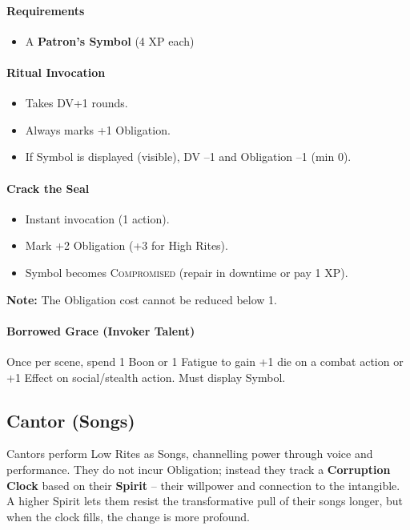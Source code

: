 \paragraph{Requirements}
\begin{itemize}
  \item A \textbf{Patron's Symbol} (4 XP each)
\end{itemize}

\paragraph{Ritual Invocation}
\begin{itemize}
  \item Takes DV+1 rounds.
  \item Always marks +1 Obligation.
  \item If Symbol is displayed (visible), DV --1 and Obligation --1 (min 0).
\end{itemize}

\paragraph{Crack the Seal}
\begin{itemize}
  \item Instant invocation (1 action).
  \item Mark +2 Obligation (+3 for High Rites).
  \item Symbol becomes \textsc{Compromised} (repair in downtime or pay 1 XP).
\end{itemize}

\textbf{Note:} The Obligation cost cannot be reduced below 1.

\paragraph{Borrowed Grace (Invoker Talent)}
Once per scene, spend 1 Boon or 1 Fatigue to gain +1 die on a combat action or +1 Effect on social/stealth action. Must display Symbol.

\subsection{Cantor (Songs)}

Cantors perform Low Rites as Songs, channelling power through voice and performance. They do not incur Obligation; instead they track a \textbf{Corruption Clock} based on their \textbf{Spirit} -- their willpower and connection to the intangible. A higher Spirit lets them resist the transformative pull of their songs longer, but when the clock fills, the change is more profound.

